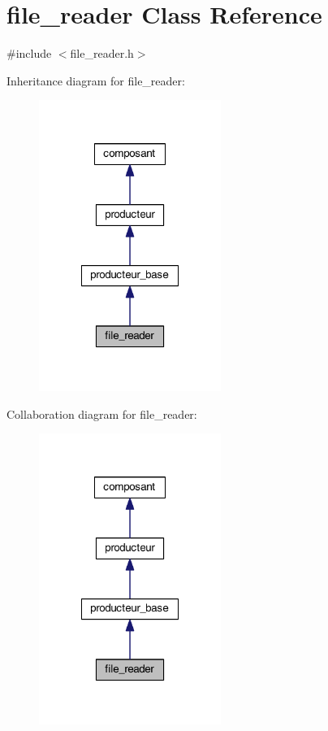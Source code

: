 \hypertarget{classfile__reader}{\section{file\-\_\-reader Class Reference}
\label{classfile__reader}
}


{\ttfamily \#include $<$file\-\_\-reader.\-h$>$}



Inheritance diagram for file\-\_\-reader\-:
\nopagebreak
\begin{figure}[H]
\begin{center}
\leavevmode
\includegraphics[width=168pt]{classfile__reader__inherit__graph}
\end{center}
\end{figure}


Collaboration diagram for file\-\_\-reader\-:
\nopagebreak
\begin{figure}[H]
\begin{center}
\leavevmode
\includegraphics[width=168pt]{classfile__reader__coll__graph}
\end{center}
\end{figure}
